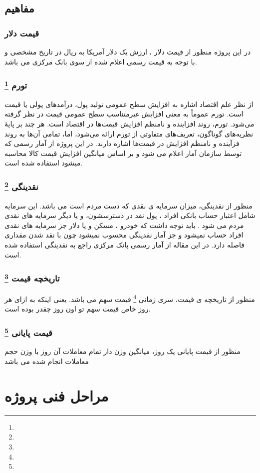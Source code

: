 \documentclass[12pt]{report}
\begin{document}
\section{مفاهیم}
\subsection{قیمت دلار}
در این پروژه منظور از قیمت دلار ، ارزش یک دلار آمریکا به ریال در تاریخ مشخصی و با توجه به قیمت رسمی اعلام شده از سوی بانک مرکزی می باشد.
\subsection{تورم
\footnote{}
}
 از نظر علم اقتصاد اشاره به افزایش سطح عمومی تولید پول، درآمدهای پولی یا قیمت است. تورم عموماً به معنی افزایش غیرمتناسب سطح عمومی قیمت در نظر گرفته می‌شود. تورم، روند افزاینده و نامنظم افزایش قیمت‌ها در اقتصاد است. هر چند بر پایهٔ نظریه‌های گوناگون، تعریف‌های متفاوتی از تورم ارائه می‌شود، اما، تمامی آن‌ها به روند فزآینده و نامنظم افزایش در قیمت‌ها اشاره دارند.
 در این پروژه از آمار رسمی که توسط سازمان آمار اعلام می شود و بر اساس میانگین افزایش قیمت کالا محاسبه میشود استفاده شده است.
\subsection{نقدینگی
\footnote{}
}
منظور از نقدینگی، میزان سرمایه ی نقدی که دست مردم است می باشد. این سرمایه شامل اعتبار حساب بانکی افراد ، پول نقد در دسترسشون، و یا دیگر سرمایه های نقدی مردم می شود . باید توجه داشت که خودرو ، مسکن و یا دلار جز سرمایه های نقدی افراد حساب نمیشود و جز آمار نقدینگی محسوب نمیشود چون با نقد شدن مقداری فاصله دارد.
در این مقاله از آمار رسمی بانک مرکزی راجع به نقدینگی استفاده شده است.
\subsection{تاریخچه قیمت
\footnote{}
}
منظور از تاریخچه ی قیمت، 
سری زمانی 
\footnote{}
قیمت سهم می باشد. یعنی اینکه به ازای هر روز خاص قیمت سهم تو اون روز چقدر بوده است.

\subsection{قیمت پایانی
\footnote{}
}
منظور از قیمت پایانی یک روز، میانگین وزن دار تمام معاملات آن روز با وزن حجم معاملات انجام شده می باشد
\chapter{مراحل فنی پروژه}
\end{document}
